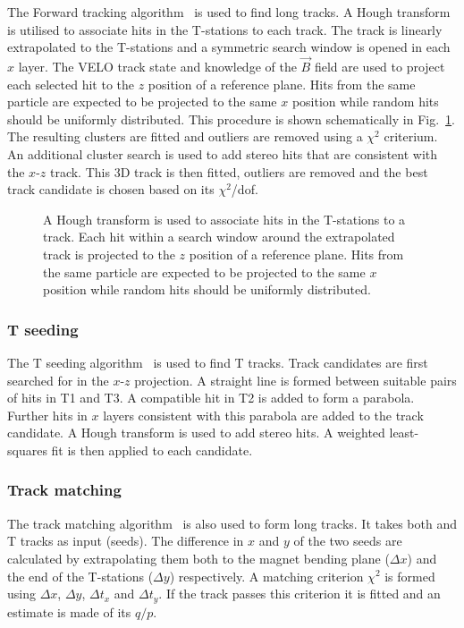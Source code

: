 The Forward tracking algorithm~\cite{patforward} is used to find long tracks. A Hough transform is utilised to associate hits in the T-stations to each \velo track. The \velo track is linearly extrapolated to the T-stations and a symmetric search window is opened in each $x$ layer. The VELO track state and knowledge of the $\vec{B}$ field are used to project each selected hit to the $z$ position of a reference plane. Hits from the same particle are expected to be projected to the same $x$ position while random hits should be uniformly distributed. This procedure is shown schematically in Fig.~\ref{fig:forward-tracking}. The resulting clusters are fitted and outliers are removed using a $\chi^{2}$ criterium. An additional cluster search is used to add stereo hits that are consistent with the $x$-$z$ track. This 3D track is then fitted, outliers are removed and the best track candidate is chosen based on its $\chi^{2}$/dof.

\begin{figure}[!tb]
  \centering
  
  \caption{A Hough transform is used to associate hits in the T-stations to a \velo track. Each hit within a search window around the extrapolated track is projected to the $z$ position of a reference plane. Hits from the same particle are expected to be projected to the same $x$ position while random hits should be uniformly distributed.}
  \label{fig:forward-tracking}
\end{figure}

\subsubsection{T seeding}
\label{sec:track:algos:seeding}

The T seeding algorithm~\cite{patseeding} is used to find T tracks. Track candidates are first searched for in the $x$-$z$ projection. A straight line is formed between suitable pairs of hits in T1 and T3. A compatible hit in T2 is added to form a parabola. Further hits in $x$ layers consistent with this parabola are added to the track candidate. A Hough transform is used to add stereo hits. A weighted least-squares fit is then applied to each candidate.

\subsubsection{Track matching}
\label{sec:track:algos:match}

The track matching algorithm~\cite{patmatch} is also used to form long tracks. It takes both \velo and T tracks as input (seeds). The difference in $x$ and $y$ of the two seeds are calculated by extrapolating them both to the magnet bending plane ($\Delta x$) and the end of the T-stations ($\Delta y$) respectively. A matching criterion $\chi^{2}$ is formed using $\Delta x$, $\Delta y$, $\Delta t_{x}$ and $\Delta t_{y}$. If the track passes this criterion it is fitted and an estimate is made of its $q/p$.

